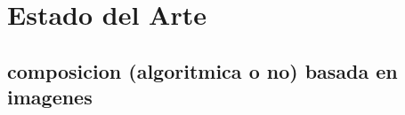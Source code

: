 \section{Estado del Arte}
\label{sec:estadodelarte}



\subsection{composicion (algoritmica o no) basada en imagenes}

